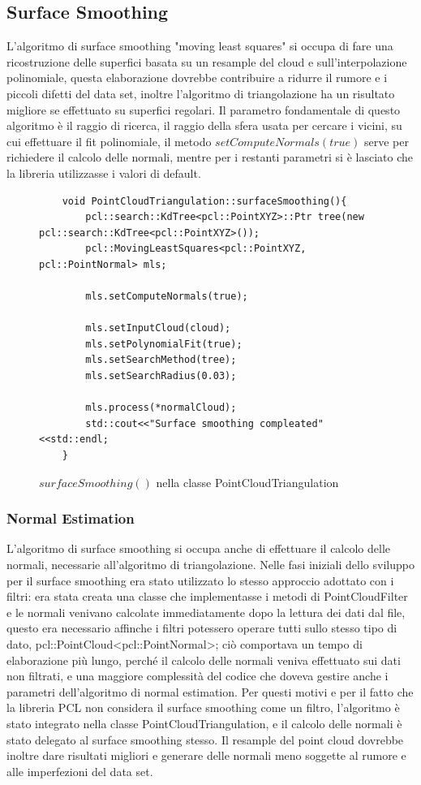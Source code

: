 \documentclass[a4paper,12pt]{article}
\begin{document}
	\subsection{Surface Smoothing}
	L'algoritmo di surface smoothing "moving least squares" si occupa di fare una ricostruzione delle superfici basata su 
	un resample del cloud e sull'interpolazione polinomiale, questa elaborazione dovrebbe contribuire a ridurre il rumore e i 
  piccoli difetti del data set, inoltre l'algoritmo di triangolazione ha un risultato migliore se effettuato su superfici
	regolari. Il parametro fondamentale di questo algoritmo è il raggio di ricerca, il raggio della sfera usata per cercare i
	vicini, su cui effettuare il fit polinomiale, il metodo $setComputeNormals(true)$ serve per richiedere il calcolo
	delle normali, mentre per i restanti parametri si è lasciato che la libreria utilizzasse i valori di default.
	\begin{figure}[H]
	\begin{lstlisting}
	void PointCloudTriangulation::surfaceSmoothing(){
    	pcl::search::KdTree<pcl::PointXYZ>::Ptr tree(new pcl::search::KdTree<pcl::PointXYZ>());
    	pcl::MovingLeastSquares<pcl::PointXYZ, pcl::PointNormal> mls;

    	mls.setComputeNormals(true);

    	mls.setInputCloud(cloud);
    	mls.setPolynomialFit(true);
    	mls.setSearchMethod(tree);
    	mls.setSearchRadius(0.03);

    	mls.process(*normalCloud);
    	std::cout<<"Surface smoothing compleated"<<std::endl;
	}
	\end{lstlisting}
	\caption{$surfaceSmoothing()$ nella classe PointCloudTriangulation}
	\label{mls}
	\end{figure}	
	\clearpage 
		\subsubsection{Normal Estimation}
		L'algoritmo di surface smoothing si occupa anche di effettuare il calcolo delle normali, necessarie all'algoritmo di
		triangolazione.
		Nelle fasi iniziali dello sviluppo per il surface smoothing era stato utilizzato lo stesso approccio adottato con i
		filtri: era stata creata una classe che implementasse i metodi di PointCloudFilter e le normali venivano calcolate
		immediatamente dopo la lettura dei dati dal file, questo era necessario affinche i filtri potessero operare tutti 
    sullo stesso tipo di dato, pcl::PointCloud\textless pcl::PointNormal\textgreater; ciò comportava un tempo di elaborazione più lungo,
		perché il calcolo delle normali veniva effettuato sui dati non filtrati, e una maggiore complessit\`a del codice 
		che doveva gestire anche i parametri dell'algoritmo di normal estimation.
		Per questi motivi e per il fatto che la libreria PCL non considera il surface smoothing come un filtro,
		l'algoritmo è stato integrato nella classe PointCloudTriangulation, e il calcolo delle normali è stato delegato
		al surface smoothing stesso.
		Il resample del point cloud dovrebbe inoltre dare risultati migliori e generare delle normali meno soggette 
		al rumore e alle imperfezioni del data set.
	\clearpage
\end{document}
